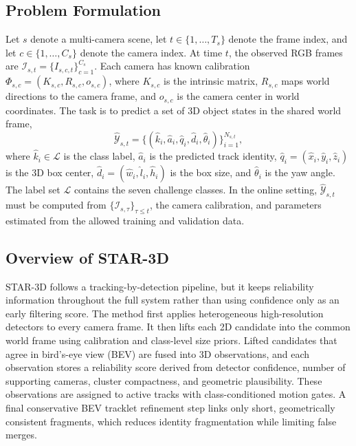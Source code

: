 \documentclass[runningheads]{llncs}
\begin{document}
\subsection{Problem Formulation}
\label{sec:method_problem}

Let $s$ denote a multi-camera scene, let $t\in\{1,\ldots,T_s\}$ denote the frame
index, and let $c\in\{1,\ldots,C_s\}$ denote the camera index. At time $t$, the
observed RGB frames are
$\mathcal{I}_{s,t}=\{I_{s,c,t}\}_{c=1}^{C_s}$. Each camera has known calibration
$\Phi_{s,c}=(K_{s,c},R_{s,c},o_{s,c})$, where $K_{s,c}$ is the intrinsic matrix,
$R_{s,c}$ maps world directions to the camera frame, and $o_{s,c}$ is the camera
center in world coordinates. The task is to predict a set of 3D object states in
the shared world frame,
\begin{equation}
    \hat{\mathcal{Y}}_{s,t}
    =
    \{(\hat{k}_i,\hat{a}_i,\hat{q}_i,\hat{d}_i,\hat{\theta}_i)\}_{i=1}^{N_{s,t}},
    \label{eq:track1_state_set}
\end{equation}
where $\hat{k}_i\in\mathcal{L}$ is the class label, $\hat{a}_i$ is the predicted
track identity, $\hat{q}_i=(\hat{x}_i,\hat{y}_i,\hat{z}_i)$ is the 3D box center,
$\hat{d}_i=(\hat{w}_i,\hat{l}_i,\hat{h}_i)$ is the box size, and
$\hat{\theta}_i$ is the yaw angle. The label set $\mathcal{L}$ contains the seven
challenge classes. In the online setting, $\hat{\mathcal{Y}}_{s,t}$ must be
computed from $\{\mathcal{I}_{s,\tau}\}_{\tau\leq t}$, the camera calibration, and
parameters estimated from the allowed training and validation data.

\subsection{Overview of STAR-3D}
\label{sec:method_overview}

STAR-3D follows a tracking-by-detection pipeline, but it keeps reliability
information throughout the full system rather than using confidence only as an
early filtering score. The method first applies heterogeneous high-resolution
detectors to every camera frame. It then lifts each 2D candidate into the common
world frame using calibration and class-level size priors. Lifted candidates that
agree in bird's-eye view (BEV) are fused into 3D observations, and each observation
stores a reliability score derived from detector confidence, number of supporting
cameras, cluster compactness, and geometric plausibility. These observations are
assigned to active tracks with class-conditioned motion gates. A final conservative
BEV tracklet refinement step links only short, geometrically consistent fragments,
which reduces identity fragmentation while limiting false merges.
\end{document}
